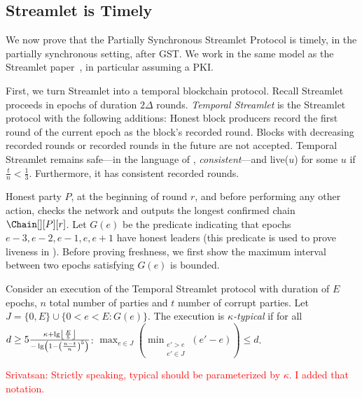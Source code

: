 \subsection{Streamlet is Timely}

We now prove that the Partially Synchronous Streamlet Protocol is timely,
in the partially synchronous setting, after GST.
We work in the same model as the Streamlet paper~\cite{streamlet},
in particular assuming a PKI.

First, we turn Streamlet into a temporal blockchain protocol.
Recall Streamlet proceeds in epochs of duration $2\Delta$ rounds.
\emph{Temporal Streamlet} is the Streamlet protocol with the
following additions: Honest block producers record the first round of the current epoch as the block's recorded round.
Blocks with decreasing recorded rounds or recorded rounds in the future are not accepted.
Temporal Streamlet remains safe---in the language of \cite{streamlet}, \emph{consistent}---and live($u$) for some $u$
if $\frac{t}{n} < \frac{1}{3}$. Furthermore, it has consistent recorded rounds.

Honest party $P$, at the beginning of round $r$, and
before performing any other action, checks the network and
outputs the longest confirmed chain $\Chain[][P][r]$.
Let $G(e)$ be the predicate indicating that epochs $e-3,e-2,e-1,e,e+1$ have honest leaders (this predicate is used to prove liveness in \cite{streamlet}).
Before proving freshness, we first show the maximum interval between two epochs satisfying $G(e)$ is bounded.

\begin{definition}
  Consider an execution of the Temporal Streamlet protocol with duration
  of $E$ epochs, $n$ total number of parties and $t$ number of corrupt parties.
  Let $J = \{0,E\} \cup \{0 < e < E: G(e)\}$.
  The execution is \emph{$\kappa$-typical} if for all
  $d \geq 5\frac{\kappa + \lg \floor*{\frac{E}{5}}}{- \lg \left(1 - \left(\frac{n - t}{n}\right)^5\right)}$:
  $\max_{e \in J}(\min_{\substack{e' > e \\ e' \in J}}(e' - e)) \leq d$.
\end{definition}

\textcolor{red}{Srivatsan: Strictly speaking, typical should be parameterized by $\kappa$. I added that notation.}

